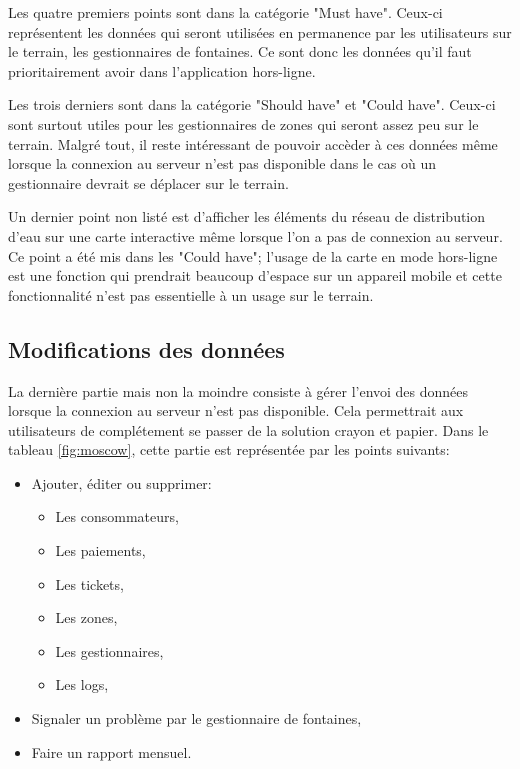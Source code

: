 \documentclass{EPL-master-thesis-covers-FR}
\begin{document}
				Les quatre premiers points sont dans la catégorie "Must have". Ceux-ci représentent les données qui seront utilisées en permanence par les utilisateurs sur le terrain, les gestionnaires de fontaines. Ce sont donc les données qu'il faut prioritairement avoir dans l'application hors-ligne.
				
				Les trois derniers sont dans la catégorie "Should have" et "Could have". Ceux-ci sont surtout utiles pour les gestionnaires de zones qui seront assez peu sur le terrain. Malgré tout, il reste intéressant de pouvoir accèder à ces données même lorsque la connexion au serveur n'est pas disponible dans le cas où un gestionnaire devrait se déplacer sur le terrain.
				
				Un dernier point non listé est d'afficher les éléments du réseau de distribution d'eau sur une carte interactive même lorsque l'on a pas de connexion au serveur. Ce point a été mis dans les "Could have"; l'usage de la carte en mode hors-ligne est une fonction qui prendrait beaucoup d'espace sur un appareil mobile et cette fonctionnalité n'est pas essentielle à un usage sur le terrain.

			\subsection*{Modifications des données}
				\label{sec:gest_donnee}
				La dernière partie mais non la moindre consiste à gérer l'envoi des données lorsque la connexion au serveur n'est pas disponible. Cela permettrait aux utilisateurs de complétement se passer de la solution crayon et papier.
				Dans le tableau \ref{fig:moscow}, cette partie est représentée par les points suivants:
				\begin{itemize}
					\item Ajouter, éditer ou supprimer:
					\begin{itemize}
						\item Les consommateurs,
						\item Les paiements,
						\item Les tickets,
						\item Les zones,
						\item Les gestionnaires,
						\item Les logs,
					\end{itemize}
					\item Signaler un problème par le gestionnaire de fontaines,
					\item Faire un rapport mensuel.
				\end{itemize}
				
\end{document}
